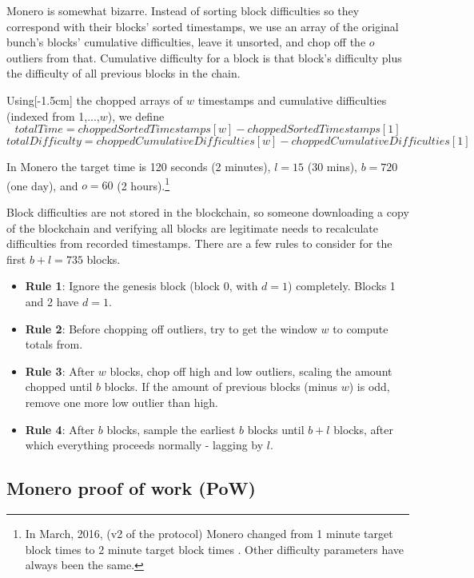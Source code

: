 Monero is somewhat bizarre. Instead of sorting block difficulties so they correspond with their blocks' sorted timestamps, we use an array of the original bunch's blocks' cumulative difficulties, leave it unsorted, and chop off the $o$ outliers from that. Cumulative difficulty for a block is that block's difficulty plus the difficulty of all previous blocks in the chain.

Using[-1.5cm] the chopped arrays of $w$ timestamps and cumulative difficulties (indexed from 1,...,$w$), we define
\[ \mathit{totalTime} = \mathit{choppedSortedTimestamps}[w] - \mathit{choppedSortedTimestamps}[1]\]
\[ \mathit{totalDifficulty} = \mathit{choppedCumulativeDifficulties}[w] - \mathit{choppedCumulativeDifficulties}[1]\]

In Monero the target time is 120 seconds (2 minutes), $l = 15$ (30 mins), $b = 720$ (one day), and $o = 60$ (2 hours).\footnote{In March, 2016, (v2 of the protocol) Monero changed from 1 minute target block times to 2 minute target block times \cite{monero-0.9.3}. Other difficulty parameters have always been the same.}

Block difficulties are not stored in the blockchain, so someone downloading a copy of the blockchain and verifying all blocks are legitimate needs to recalculate difficulties from recorded timestamps. There are a few rules to consider for the first $b+l = 735$ blocks.

\begin{itemize}
    \item[] \textbf{Rule 1}: Ignore the genesis block (block 0, with $d = 1$) completely. Blocks 1 and 2 have $d = 1$.
    \item[] \textbf{Rule 2}: Before chopping off outliers, try to get the window $w$ to compute totals from.
    \item[] \textbf{Rule 3}: After $w$ blocks, chop off high and low outliers, scaling the amount chopped until $b$ blocks. If the amount of previous blocks (minus $w$) is odd, remove one more low outlier than high.
    \item[] \textbf{Rule 4}: After $b$ blocks, sample the earliest $b$ blocks until $b+l$ blocks, after which everything proceeds normally - lagging by $l$.
\end{itemize}


\subsection*{Monero proof of work (PoW)}

